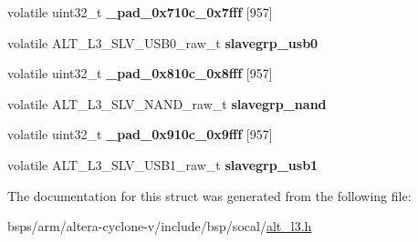 \begin{DoxyCompactItemize}
volatile uint32\+\_\+t {\bfseries \+\_\+pad\+\_\+0x710c\+\_\+0x7fff} \mbox{[}957\mbox{]}
\item 
\mbox{\label{structALT__L3__SLVGRP__raw__s_a957f4720c03f60c29c615f56f74152fa}} 
volatile A\+L\+T\+\_\+\+L3\+\_\+\+S\+L\+V\+\_\+\+U\+S\+B0\+\_\+raw\+\_\+t {\bfseries slavegrp\+\_\+usb0}
\item 
\mbox{\label{structALT__L3__SLVGRP__raw__s_a997458c33eb1b7ac261cb843bc76d6e7}} 
volatile uint32\+\_\+t {\bfseries \+\_\+pad\+\_\+0x810c\+\_\+0x8fff} \mbox{[}957\mbox{]}
\item 
\mbox{\label{structALT__L3__SLVGRP__raw__s_ac45f4768254d108026c1c2ff83c1b38d}} 
volatile A\+L\+T\+\_\+\+L3\+\_\+\+S\+L\+V\+\_\+\+N\+A\+N\+D\+\_\+raw\+\_\+t {\bfseries slavegrp\+\_\+nand}
\item 
\mbox{\label{structALT__L3__SLVGRP__raw__s_a6cc464f3807d681502fa9b6f0514c2c4}} 
volatile uint32\+\_\+t {\bfseries \+\_\+pad\+\_\+0x910c\+\_\+0x9fff} \mbox{[}957\mbox{]}
\item 
\mbox{\label{structALT__L3__SLVGRP__raw__s_a7c1d2ec18fe7b316552e618e0c07438f}} 
volatile A\+L\+T\+\_\+\+L3\+\_\+\+S\+L\+V\+\_\+\+U\+S\+B1\+\_\+raw\+\_\+t {\bfseries slavegrp\+\_\+usb1}
\end{DoxyCompactItemize}


The documentation for this struct was generated from the following file\+:\begin{DoxyCompactItemize}
\item 
bsps/arm/altera-\/cyclone-\/v/include/bsp/socal/\mbox{\hyperlink{alt__l3_8h}{alt\+\_\+l3.\+h}}\end{DoxyCompactItemize}
